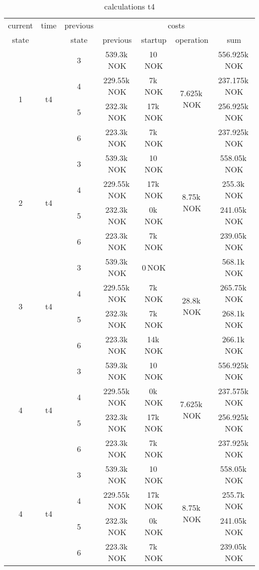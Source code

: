 \documentclass{article}
\begin{document}
	\begin{table}[hbt!]
\begin{center}
\begin{tabular}[h]{|c|c|c||c|c|c||c|}
\hline
current & time & previous   & \multicolumn{4}{|c|}{costs}\\
\cline{4-7}
state  		&      	&  state    &   previous    	&    startup   		& operation 		&  sum \\
\hline
\hline
\multirow{4}{*}{1} & \multirow{4}{*}{t4}	
	&	3		&		539.3k\,NOK			&	10\,NOK			&	\multirow{4}{*}{7.625k\,NOK}		&	556.925k\,NOK\\
&	&	4		&		229.55k\,NOK		&	7k\,NOK			&										&	237.175k\,NOK\\
&	&	5		&		232.3k\,NOK			&	17k\,NOK		&										&	256.925k\,NOK\\
&	&	6		&		223.3k\,NOK			&	7k\,NOK			&										&	237.925k\,NOK\\
\hline
\multirow{4}{*}{2} & \multirow{4}{*}{t4}	
	&	3		&		539.3k\,NOK			&	10\,NOK			&	\multirow{4}{*}{8.75k\,NOK}		&	558.05k\,NOK\\
&	&	4		&		229.55k\,NOK		&	17k\,NOK		&										&	255.3k\,NOK\\
&	&	5		&		232.3k\,NOK			&	0k\,NOK			&										&	241.05k\,NOK\\
&	&	6		&		223.3k\,NOK			&	7k\,NOK			&										&	239.05k\,NOK\\
\hline
\multirow{4}{*}{3} & \multirow{4}{*}{t4}	
	&	3		&		539.3k\,NOK			&	0\,NOK			&	\multirow{4}{*}{28.8k\,NOK}		&	568.1k\,NOK\\
&	&	4		&		229.55k\,NOK		&	7k\,NOK			&										&	265.75k\,NOK\\
&	&	5		&		232.3k\,NOK			&	7k\,NOK			&										&	268.1k\,NOK\\
&	&	6		&		223.3k\,NOK			&	14k\,NOK		&										&	266.1k\,NOK\\
\hline
\multirow{4}{*}{4} & \multirow{4}{*}{t4}	
	&	3		&		539.3k\,NOK			&	10\,NOK			&	\multirow{4}{*}{7.625k\,NOK}		&	556.925k\,NOK\\
&	&	4		&		229.55k\,NOK		&	0k\,NOK			&										&	237.575k\,NOK\\
&	&	5		&		232.3k\,NOK			&	17k\,NOK		&										&	256.925k\,NOK\\
&	&	6		&		223.3k\,NOK			&	7k\,NOK			&										&	237.925k\,NOK\\
\hline
\multirow{5}{*}{4} & \multirow{4}{*}{t4}	
	&	3		&		539.3k\,NOK			&	10\,NOK			&	\multirow{4}{*}{8.75k\,NOK}		&	558.05k\,NOK\\
&	&	4		&		229.55k\,NOK		&	17k\,NOK		&										&	255.7k\,NOK\\
&	&	5		&		232.3k\,NOK			&	0k\,NOK			&										&	241.05k\,NOK\\
&	&	6		&		223.3k\,NOK			&	7k\,NOK			&										&	239.05k\,NOK\\
\hline
\end{tabular}
\caption{calculations t4}\label{tab:calct4}
\end{center}
\end{table}
\end{document}
